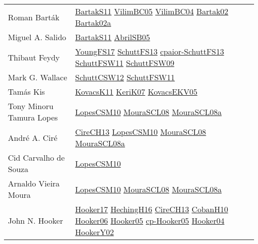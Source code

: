 {\begin{longtable}{p{4cm}p{15cm}}
Roman Bart{\'{a}}k & \href{articles/BartakS11.pdf}{BartakS11}\cite{BartakS11} \href{articles/VilimBC05.pdf}{VilimBC05}\cite{VilimBC05} \href{papers/VilimBC04.pdf}{VilimBC04}\cite{VilimBC04} \href{papers/Bartak02.pdf}{Bartak02}\cite{Bartak02} \href{papers/Bartak02a.pdf}{Bartak02a}\cite{Bartak02a} \\
Miguel A. Salido & \href{articles/BartakS11.pdf}{BartakS11}\cite{BartakS11} \href{papers/AbrilSB05.pdf}{AbrilSB05}\cite{AbrilSB05} \\
Thibaut Feydy & \href{papers/YoungFS17.pdf}{YoungFS17}\cite{YoungFS17} \href{papers/SchuttFS13.pdf}{SchuttFS13}\cite{SchuttFS13} \href{papers/cpaior-SchuttFS13.pdf}{cpaior-SchuttFS13}\cite{cpaior-SchuttFS13} \href{articles/SchuttFSW11.pdf}{SchuttFSW11}\cite{SchuttFSW11} \href{papers/SchuttFSW09.pdf}{SchuttFSW09}\cite{SchuttFSW09} \\
Mark G. Wallace & \href{papers/SchuttCSW12.pdf}{SchuttCSW12}\cite{SchuttCSW12} \href{articles/SchuttFSW11.pdf}{SchuttFSW11}\cite{SchuttFSW11} \\
Tam{\'{a}}s Kis & \href{articles/KovacsK11.pdf}{KovacsK11}\cite{KovacsK11} \href{papers/KeriK07.pdf}{KeriK07}\cite{KeriK07} \href{papers/KovacsEKV05.pdf}{KovacsEKV05}\cite{KovacsEKV05} \\
Tony Minoru Tamura Lopes & \href{articles/LopesCSM10.pdf}{LopesCSM10}\cite{LopesCSM10} \href{papers/MouraSCL08.pdf}{MouraSCL08}\cite{MouraSCL08} \href{papers/MouraSCL08a.pdf}{MouraSCL08a}\cite{MouraSCL08a} \\
Andr{\'{e}} A. Cir{\'{e}} & \href{papers/CireCH13.pdf}{CireCH13}\cite{CireCH13} \href{articles/LopesCSM10.pdf}{LopesCSM10}\cite{LopesCSM10} \href{papers/MouraSCL08.pdf}{MouraSCL08}\cite{MouraSCL08} \href{papers/MouraSCL08a.pdf}{MouraSCL08a}\cite{MouraSCL08a} \\
Cid Carvalho de Souza & \href{articles/LopesCSM10.pdf}{LopesCSM10}\cite{LopesCSM10} \\
Arnaldo Vieira Moura & \href{articles/LopesCSM10.pdf}{LopesCSM10}\cite{LopesCSM10} \href{papers/MouraSCL08.pdf}{MouraSCL08}\cite{MouraSCL08} \href{papers/MouraSCL08a.pdf}{MouraSCL08a}\cite{MouraSCL08a} \\
John N. Hooker & \href{papers/Hooker17.pdf}{Hooker17}\cite{Hooker17} \href{papers/HechingH16.pdf}{HechingH16}\cite{HechingH16} \href{papers/CireCH13.pdf}{CireCH13}\cite{CireCH13} \href{papers/CobanH10.pdf}{CobanH10}\cite{CobanH10} \href{articles/Hooker06.pdf}{Hooker06}\cite{Hooker06} \href{articles/Hooker05.pdf}{Hooker05}\cite{Hooker05} \href{papers/cp-Hooker05.pdf}{cp-Hooker05}\cite{cp-Hooker05} \href{papers/Hooker04.pdf}{Hooker04}\cite{Hooker04} \href{papers/HookerY02.pdf}{HookerY02}\cite{HookerY02} \\

\end{longtable}}
